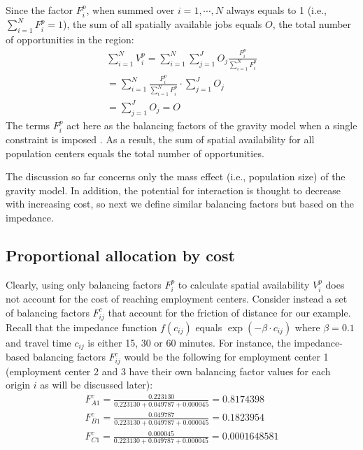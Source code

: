 \documentclass[]{elsarticle} %
\begin{document}
Since the factor \(F^p_{i}\), when summed over \(i=1,\cdots,N\) always
equals to 1 (i.e., \(\sum_{i=1}^{N} F^p_{i} = 1\)), the sum of all
spatially available jobs equals \(O\), the total number of opportunities
in the region: \[
\begin{array}{l}
\sum_{i=1}^N V^p_i =\sum_{i=1}^N\sum_{j=1}^JO_j\frac{F^p_{i}}{\sum_{i=1}^N F^p_{i}}\\
=\sum_{i=1}^N \frac{F^p_{i}}{\sum_{i=1}^N F^p_{i}}\cdot\sum_{j=1}^JO_j\\
=\sum_{j=1}^J O_j = O
\end{array}
\] The terms \(F^p_{i}\) act here as the balancing factors of the
gravity model when a single constraint is imposed \citep[i.e., to ensure
that the sums of columns are equal to the number of opportunities per
destination, see][pp.~179-180 and 183-184]{ortuzar_2011_modelling}. As a
result, the sum of spatial availability for all population centers
equals the total number of opportunities.

The discussion so far concerns only the mass effect (i.e., population
size) of the gravity model. In addition, the potential for interaction
is thought to decrease with increasing cost, so next we define similar
balancing factors but based on the impedance.

\hypertarget{proportional-allocation-by-cost}{%
\subsection{Proportional allocation by
cost}\label{proportional-allocation-by-cost}}

Clearly, using only balancing factors \(F^p_{i}\) to calculate spatial
availability \(V^p_i\) does not account for the cost of reaching
employment centers. Consider instead a set of balancing factors
\(F^c_{ij}\) that account for the friction of distance for our example.
Recall that the impedance function \(f(c_{ij})\) equals
\(\exp(-\beta\cdot c_{ij})\) where \(\beta = 0.1\) and travel time
\(c_{ij}\) is either 15, 30 or 60 minutes. For instance, the
impedance-based balancing factors \(F^c_{ij}\) would be the following
for employment center 1 (employment center 2 and 3 have their own
balancing factor values for each origin \(i\) as will be discussed
later): \[
\begin{array}{l}
F^c_{A1} = \frac{0.223130}{0.223130 + 0.049787 + 0.000045} = 0.8174398\\
F^c_{B1} = \frac{0.049787}{0.223130 + 0.049787 + 0.000045} = 0.1823954\\
F^c_{C1} = \frac{0.000045}{0.223130 + 0.049787 + 0.000045} = 0.0001648581\\
\end{array}
\]
\end{document}
